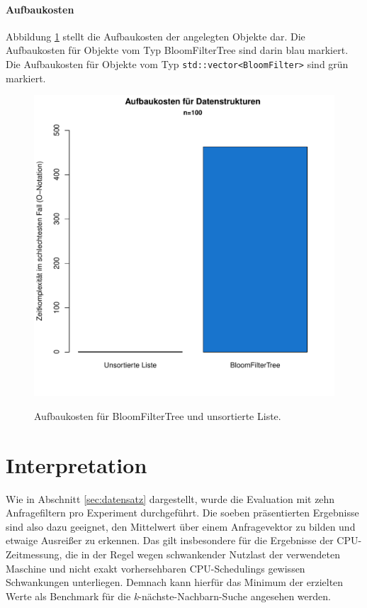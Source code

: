 \paragraph*{Aufbaukosten}
Abbildung \ref{fig:pic19} stellt die Aufbaukosten der angelegten Objekte dar. Die Aufbaukosten für Objekte vom Typ BloomFilterTree sind darin blau markiert. Die Aufbaukosten für Objekte vom Typ \texttt{std::vector<BloomFilter>} sind grün markiert. 
\begin{figure}[hptb]
	\centering
	\includegraphics[scale=0.7]{pictures/cost.pdf}\\
	\caption[Aufbaukosten für BloomFilterTree und unsortierte Liste]{Aufbaukosten für BloomFilterTree und unsortierte Liste.}\label{fig:pic19}
\end{figure}
\newpage
\section{Interpretation}\label{sec:interpretation}
Wie in Abschnitt \ref{sec:datensatz} dargestellt, wurde die Evaluation mit zehn Anfragefiltern pro Experiment durchgeführt. Die soeben präsentierten Ergebnisse sind also dazu geeignet, den Mittelwert über einem Anfragevektor zu bilden und etwaige Ausreißer zu erkennen. Das gilt insbesondere für die Ergebnisse der CPU-Zeitmessung, die in der Regel wegen schwankender Nutzlast der verwendeten Maschine und nicht exakt vorhersehbaren CPU-Schedulings gewissen Schwankungen unterliegen. Demnach kann hierfür das Minimum der erzielten Werte als Benchmark für die \textit{k}-nächste-Nachbarn-Suche angesehen werden. 
